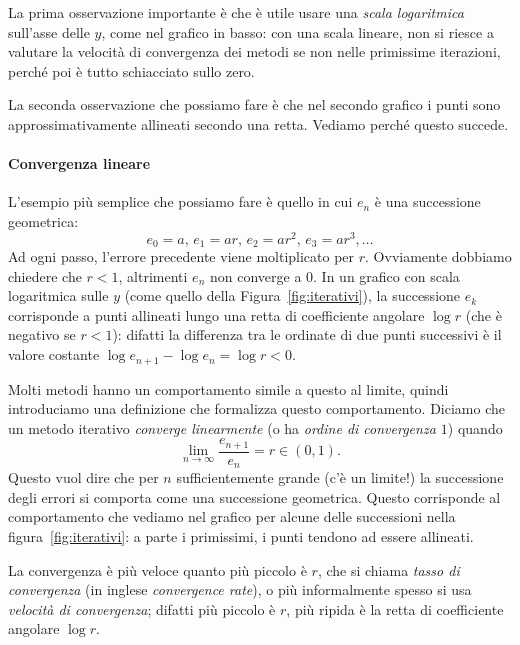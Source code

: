 \documentclass[a4paper]{report}
\theoremstyle{definiton}
\theoremstyle{remark}
\begin{document}
La prima osservazione importante è che è utile usare una \emph{scala logaritmica} sull'asse delle $y$, come nel grafico in basso: con una scala lineare, non si riesce a valutare la velocità di convergenza dei metodi se non nelle primissime iterazioni, perché poi è tutto schiacciato sullo zero.

La seconda osservazione che possiamo fare è che nel secondo grafico i punti sono approssimativamente allineati secondo una retta. Vediamo perché questo succede.

\paragraph{Convergenza lineare} L'esempio più semplice che possiamo fare è quello in cui $e_n$ è una successione geometrica:
\[
e_0 = a,\, e_1 = ar,\, e_2 = ar^2,\, e_3 = ar^3, \dots
\]
Ad ogni passo, l'errore precedente viene moltiplicato per $r$. Ovviamente dobbiamo chiedere che $r < 1$, altrimenti $e_n$ non converge a $0$. In un grafico con scala logaritmica sulle $y$ (come quello della Figura~\ref{fig:iterativi}), la successione $e_k$ corrisponde a punti allineati lungo una retta di coefficiente angolare $\log r$ (che è negativo se $r<1$): difatti la differenza tra le ordinate di due punti successivi è il valore costante $\log e_{n+1} - \log e_n = \log r < 0$.

Molti metodi hanno un comportamento simile a questo al limite, quindi introduciamo una definizione che formalizza questo comportamento. Diciamo che un metodo iterativo \emph{converge linearmente} (o ha \emph{ordine di convergenza $1$}) quando
\begin{equation} \label{tassoconv}
    \lim_{n \to \infty }\frac{e_{n+1}}{e_n} = r \in (0,1).    
\end{equation}
Questo vuol dire che per $n$ sufficientemente grande (c'è un limite!) la successione degli errori si comporta come una successione geometrica. Questo corrisponde al comportamento che vediamo nel grafico per alcune delle successioni nella figura~\ref{fig:iterativi}: a parte i primissimi, i punti tendono ad essere allineati.

La convergenza è più veloce quanto più piccolo è $r$, che si chiama \emph{tasso di convergenza} (in inglese \emph{convergence rate}), o più informalmente spesso si usa \emph{velocità di convergenza}; difatti più piccolo è $r$, più ripida è la retta di coefficiente angolare $\log r$.
\end{document}
